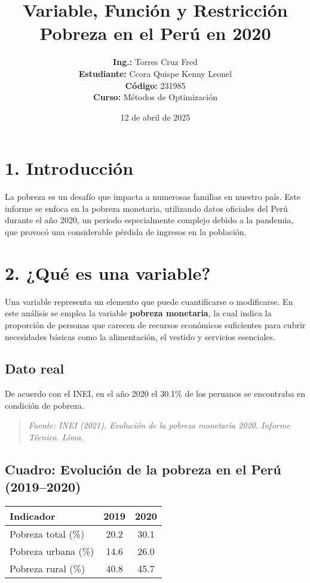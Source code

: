 \documentclass[12pt]{article}
\title{\textbf{Variable, Funci\'on y Restricci\'on} \\ \large \textbf{Pobreza en el Per\'u en 2020}}
\author{\textbf{Ing.:} Torres Cruz Fred \\ \textbf{Estudiante:} Ccora Quispe Kenny Leonel \\ \textbf{C\'odigo:} 231985 \\ \textbf{Curso:} M\'etodos de Optimizaci\'on}
\date{12 de abril de 2025}
\begin{document}
\maketitle

\section*{1. Introducci\'on}
La pobreza es un desafío que impacta a numerosas familias en nuestro país. Este informe se enfoca en la pobreza monetaria, utilizando datos oficiales del Perú durante el año 2020, un periodo especialmente complejo debido a la pandemia, que provocó una considerable pérdida de ingresos en la población.

\section*{2. \textbf{¿Qu\'e es una variable?}}
Una variable representa un elemento que puede cuantificarse o modificarse. En este análisis se emplea la variable \textbf{pobreza monetaria}, la cual indica la proporción de personas que carecen de recursos económicos suficientes para cubrir necesidades básicas como la alimentación, el vestido y servicios esenciales.

\subsection*{Dato real}
De acuerdo con el INEI, en el año 2020 el 30.1\% de los peruanos se encontraba en condición de pobreza.

\begin{quote}
\textit{Fuente: INEI (2021). Evolución de la pobreza monetaria 2020. Informe Técnico. Lima.}
\end{quote}

\subsection*{Cuadro: Evolución de la pobreza en el Perú (2019--2020)}
\begin{center}
\begin{tabular}{|>{\raggedright}m{5cm}|c|c|}
\hline
\textbf{Indicador} & \textbf{2019} & \textbf{2020} \\
\hline
Pobreza total (\%) & 20.2 & 30.1 \\
\hline
Pobreza urbana (\%) & 14.6 & 26.0 \\
\hline
Pobreza rural (\%) & 40.8 & 45.7 \\
\hline
\end{tabular}
\end{center}
\end{document}
